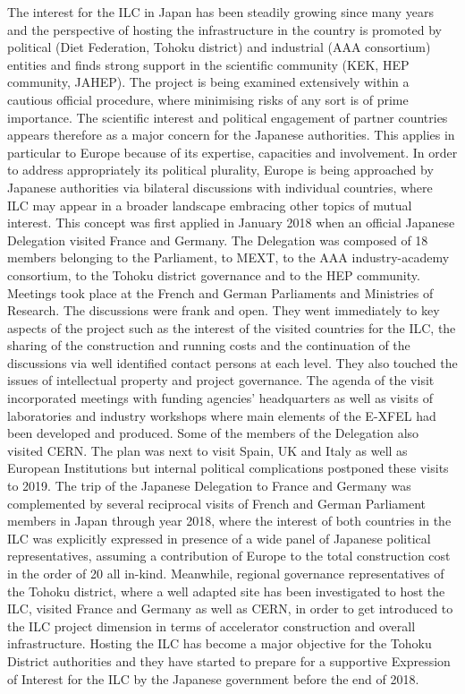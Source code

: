 \documentclass[%
 reprint,
 amsmath,amssymb,
 aps,
]{revtex4-1}
\begin{document}
The interest for the ILC in Japan has been steadily growing since many years and the perspective
of hosting the infrastructure in the country is promoted by political (Diet Federation, Tohoku district)
and industrial (AAA consortium) entities and finds strong support in the scientific community (KEK,
HEP community, JAHEP). The project is being examined extensively within a cautious official procedure, 
where minimising risks of any sort is of prime importance. The scientific interest and political
engagement of partner countries appears therefore as a major concern for the Japanese authorities. This
applies in particular to Europe because of its expertise, capacities and involvement.
In order to address appropriately its political plurality, Europe is being approached by Japanese
authorities via bilateral discussions with individual countries, where ILC may appear in a broader
landscape embracing other topics of mutual interest. This concept was first applied in January 2018
when an official Japanese Delegation visited France and Germany. The Delegation was composed of
18 members belonging to the Parliament, to MEXT, to the AAA industry-academy consortium, to the
Tohoku district governance and to the HEP community. Meetings took place at the French and German
Parliaments and Ministries of Research. The discussions were frank and open. They went immediately
to key aspects of the project such as the interest of the visited countries for the ILC, the sharing of the
construction and running costs and the continuation of the discussions via well identified contact persons
at each level. They also touched the issues of intellectual property and project governance. The agenda
of the visit incorporated meetings with funding agencies' headquarters as well as visits of laboratories
and industry workshops where main elements of the E-XFEL had been developed and produced. Some
of the members of the Delegation also visited CERN. The plan was next to visit Spain, UK and Italy
as well as European Institutions but internal political complications postponed these visits to 2019.
The trip of the Japanese Delegation to France and Germany was complemented by several reciprocal
visits of French and German Parliament members in Japan through year 2018, where the interest of
both countries in the ILC was explicitly expressed in presence of a wide panel of Japanese political
representatives, assuming a contribution of Europe to the total construction cost in the order of 20 %
all in-kind. Meanwhile, regional governance representatives of the Tohoku district, where a well adapted
site has been investigated to host the ILC, visited France and Germany as well as CERN, in order to get
introduced to the ILC project dimension in terms of accelerator construction and overall infrastructure.
Hosting the ILC has become a major objective for the Tohoku District authorities and they have started
to prepare for a supportive Expression of Interest for the ILC by the Japanese government before the
end of 2018.
\end{document}
